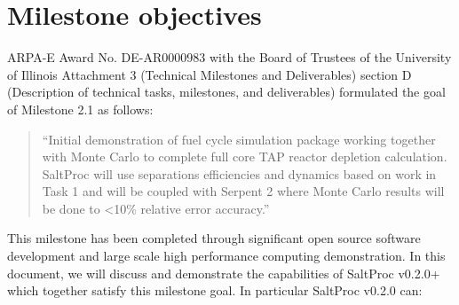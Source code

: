 \documentclass[12pt]{article} %
\begin{document}
\section{Milestone objectives}
ARPA-E Award No. DE-AR0000983 with the Board of Trustees of the University of Illinois Attachment 3 (Technical Milestones and Deliverables) section D (Description of 
technical tasks, milestones, and deliverables) formulated the goal of Milestone 2.1 as follows: 

\begin{quote}
``Initial demonstration of fuel cycle simulation package working together with 
Monte Carlo to complete full core TAP reactor depletion calculation. SaltProc 
will use separations efficiencies and dynamics based on work in Task 1 and will 
be coupled with Serpent 2 where Monte Carlo results will be done to <10\% 
relative error accuracy.''
\end{quote}
        
This milestone has been completed through significant open source software 
development and large scale high performance computing demonstration. In this 
document, we will discuss and demonstrate the capabilities of SaltProc v0.2.0+ 
which together satisfy this milestone goal. In particular SaltProc v0.2.0 can:
\end{document}
